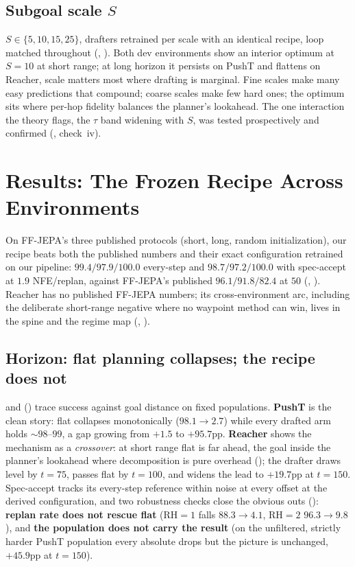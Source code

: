 \documentclass{article}
\begin{document}
\subsection{Subgoal scale $S$}
\label{sec:calib-scale}
$S\in\{5,10,15,25\}$, drafters retrained per scale with an identical recipe, loop
matched throughout (, ). Both dev environments
show an interior optimum at $S{=}10$ at short range; at long horizon it persists
on PushT and flattens on Reacher, scale matters most where drafting is
marginal. Fine scales make many easy predictions that compound; coarse scales
make few hard ones; the optimum sits where per-hop fidelity balances the
planner's lookahead. The one interaction the theory flags, the $\tau$ band
widening with $S$, was tested prospectively and confirmed (,
check~iv).

\section{Results: The Frozen Recipe Across Environments}
\label{sec:results}

\label{sec:results-headline}
On FF-JEPA's three published protocols (short, long, random initialization),
our recipe beats both the published numbers and their exact configuration
retrained on our pipeline: $99.4/97.9/100.0$ every-step
and $98.7/97.2/100.0$ with spec-accept at $1.9$ NFE/replan, against FF-JEPA's
published $96.1/91.8/82.4$ at $50$ (, ).
Reacher has no published FF-JEPA numbers; its cross-environment arc, including
the deliberate short-range negative where no waypoint method can win, lives in
the spine and the regime map (, ).

\subsection{Horizon: flat planning collapses; the recipe does not}
\label{sec:results-horizon}
 and  () trace success
against goal distance on fixed populations. \textbf{PushT} is the clean story:
flat collapses monotonically ($98.1\to2.7$) while every drafted arm holds
${\sim}98$--$99$, a gap growing from $+1.5$ to $+95.7$pp. \textbf{Reacher}
shows the mechanism as a \emph{crossover}: at short range flat is far ahead,
the goal inside the planner's lookahead where decomposition is pure overhead
(); the drafter draws level by $t{=}75$, passes flat by
$t{=}100$, and widens the lead to $+19.7$pp at $t{=}150$. Spec-accept tracks
its every-step
reference within noise at every offset at the derived configuration, and two
robustness checks close the obvious outs ():
\textbf{replan rate does not rescue flat} (RH${=}1$ falls $88.3\to4.1$,
RH${=}2$ $96.3\to9.8$), and \textbf{the population does not carry the result}
(on the unfiltered, strictly harder PushT population every absolute drops but
the picture is unchanged, $+45.9$pp at $t{=}150$).
\end{document}
